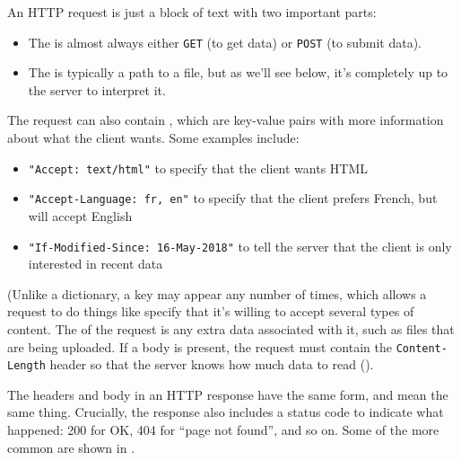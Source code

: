 An HTTP request is just a block of text with two important parts:

\begin{itemize}
\item
  The  is almost always either \texttt{GET} (to get data) or \texttt{POST} (to submit data).
\item
  The  is typically a path to a file,
  but as we'll see below,
  it's completely up to the server to interpret it.
\end{itemize}

The request can also contain ,
which are key-value pairs with more information about what the client wants.
Some examples include:

\begin{itemize}
\item
  \texttt{"Accept:\ text/html"} to specify that the client wants HTML
\item
  \texttt{"Accept-Language:\ fr,\ en"} to specify that the client prefers French, but will accept English
\item
  \texttt{"If-Modified-Since:\ 16-May-2018"} to tell the server that the client is only interested in recent data
\end{itemize}

(Unlike a dictionary, a key may appear any number of times,
which allows a request to do things like specify that it's willing to accept several types of content.
The  of the request is any extra data associated with it,
such as files that are being uploaded.
If a body is present,
the request must contain the \texttt{Content-Length} header
so that the server knows how much data to read
().


The headers and body in an HTTP response have the same form, and mean the same thing.
Crucially,
the response also includes a status code to indicate what happened:
200 for OK, 404 for ``page not found'', and so on.
Some of the more common are shown in .

